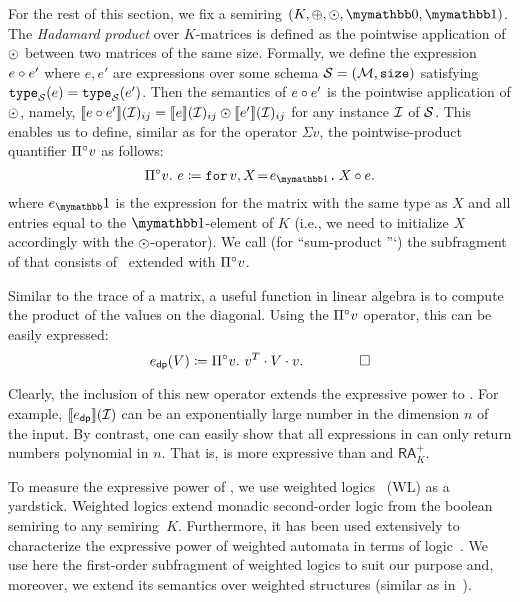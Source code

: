 For the rest of this section, we fix a semiring $(K, \ksum, \kprod, \kzero, \kone)$. The \textit{Hadamard product} over $K$-matrices is defined as the pointwise application of $\odot$ between two matrices of the same size. Formally, we define the expression $e \circ e'$ where $e, e'$ are expressions  over
some schema $\mathcal{S}=(\mathcal{M},\texttt{size})$ satisfying  $\texttt{type}_{\mathcal{S}}(e) = \texttt{type}_{\mathcal{S}}(e')$. Then the semantics of $e \circ e'$ is the pointwise application of $\odot$, namely, $\llbracket e \circ e' \rrbracket(\mathcal{I})_{ij} = \llbracket e \rrbracket(\mathcal{I})_{ij} \odot \llbracket e' \rrbracket(\mathcal{I})_{ij}$ for any instance $\mathcal{I}$ of $\mathcal{S}$. This enables us to define, similar as for the operator $\Sigma v$, the  pointwise-product quantifier $\Pi^{\circ} v$ as follows:
$$
\qhadprod v. \  e \coloneqq  \ffor{v}{X\!=\!e_{\kone}}{X \circ e}.
$$
where $e_\kone$ is the \langfor expression for the matrix with the same type as $X$ and all entries equal to the $\kone$-element of $K$ (i.e., we need to initialize $X$ accordingly with the $\odot$-operator).
We call \langprod  (for ``sum-product \lang''`) the subfragment of \langfor that consists of \langsum \ extended with $\Pi^{\circ} v$.

\begin{example}
	Similar to the trace of a matrix, a useful function in linear algebra is to compute the product of the values on the diagonal. 
	Using the $\Pi^{\circ} v$ operator, this can be easily expressed:
\begin{equation*}
	 e_{\mathsf{dp}}(V) \coloneqq  \Pi^{\circ} v. \ v^T\cdot V \cdot v. \tag*{$\qed$}
\end{equation*}
\end{example}

Clearly, the inclusion of this new operator extends the expressive power to \langsum. For example,  $\llbracket e_{\mathsf{dp}} \rrbracket(\mathcal{I})$ can be an exponentially large number in the dimension $n$ of the input.
By contrast, one can easily show that all expressions in \langsum can only return numbers polynomial in  $n$. That is, \langprod is more expressive than \langsum and $\mathsf{RA}_{K}^+$. 

To measure the expressive power of \langprod, we use weighted logics~\cite{DrosteG05} (WL) as a yardstick. Weighted logics extend monadic second-order logic from the boolean semiring to any semiring~$K$. Furthermore, it has been used extensively to characterize the expressive power of weighted automata in terms of logic~\cite{droste2009handbook}. We use here the first-order subfragment of weighted logics to suit our purpose and, moreover, we extend its semantics over weighted structures (similar as in~\cite{GradelV17}).

